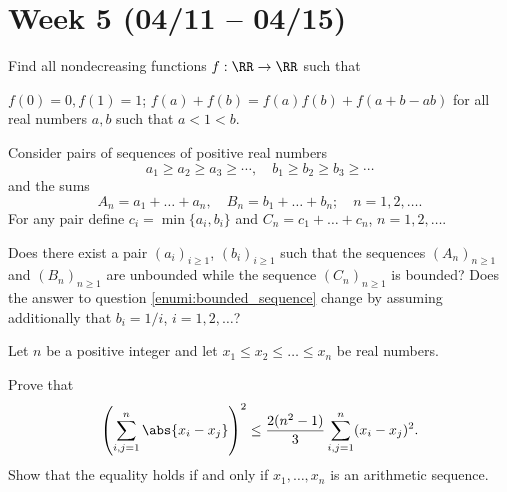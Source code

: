 \section{Week 5 (04/11 -- 04/15)}

\begin{probEG}
	Find all nondecreasing functions $f:\RR\to\RR$ such that
	\begin{enumerate}[(i)]
		\ii $f(0)=0,f(1)=1$;
		\ii $f(a)+f(b)=f(a)f(b)+f(a+b-ab)$ for all real numbers $a,b$ such that $a<1<b$.
	\end{enumerate}
\end{probEG}

\begin{probEG}
	Consider pairs of sequences of positive real numbers
	\[a_1\ge a_2\ge a_3\ge\cdots,\quad b_1\ge b_2\ge b_3\ge\cdots\]
	and the sums
	\[A_n=a_1+\dots+a_n,\quad B_n=b_1+\dots+b_n;\quad n=1,2,\dots.\]
	For any pair define $c_i=\min\{a_i,b_i\}$ and $C_n=c_1+\dots+c_n$, $n=1,2,\dots$.
	\begin{enumerate}[(1)]
		\ii \label{enumi:bounded_sequence} Does there exist a pair $(a_i)_{i\ge 1}$, $(b_i)_{i\ge 1}$ such that the sequences $(A_n)_{n\ge 1}$ and $(B_n)_{n\ge 1}$ are unbounded while the sequence $(C_n)_{n\ge 1}$ is bounded?
		\ii Does the answer to question \ref{enumi:bounded_sequence} change by assuming additionally that $b_i=1/i$, $i=1,2,\dots$?
	\end{enumerate}
\end{probEG}

\begin{probMR}
	Let $n$ be a positive integer and let $x_1\le x_2\le\dots\le x_n$ be real numbers.
	\begin{enumerate}[(1)]
		\ii Prove that
		\[\left(\sum_{i,j=1}^n\abs{x_i-x_j}\right)^2\le\frac{2(n^2-1)}{3}\sum_{i,j=1}^n(x_i-x_j)^2.\]
		\ii Show that the equality holds if and only if $x_1,\dots,x_n$ is an arithmetic sequence.
	\end{enumerate}
\end{probMR}

